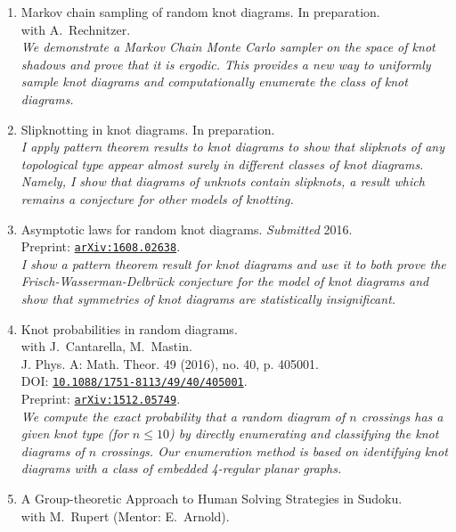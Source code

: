 \documentclass[letterpaper]{article}
\begin{document}
\begin{enumerate}
\item Markov chain sampling of random knot diagrams. In preparation. \\
  with A.\ Rechnitzer. \\
  \textit{We demonstrate a Markov Chain Monte Carlo sampler on the space of knot
    shadows and prove that it is ergodic. This provides a new way to uniformly
    sample knot diagrams and computationally enumerate the class of knot
    diagrams.}
\item Slipknotting in knot diagrams. In preparation. \\
  \textit{I apply pattern theorem results to knot diagrams to show that
    slipknots of any topological type appear almost surely in different classes
    of knot diagrams. Namely, I show that diagrams of unknots contain slipknots,
    a result which remains a conjecture for other models of knotting.}
\item Asymptotic laws for random knot diagrams. \emph{Submitted} 2016. \\
  Preprint: \href{http://arxiv.org/abs/1608.02638}{\tt arXiv:1608.02638}. \\
  \textit{I show a pattern theorem result for knot diagrams and use it to both
    prove the Frisch-Wasserman-Delbr\"uck conjecture for the model of knot
    diagrams and show that symmetries of knot diagrams are statistically
    insignificant.}
\item Knot probabilities in random diagrams.\\
  with J.\ Cantarella, M.\ Mastin. \\
  J. Phys. A: Math. Theor. 49 (2016), no. 40, p. 405001.\\
  DOI: \href{http://dx.doi.org/10.1088/1751-8113/49/40/405001}{\tt 10.1088/1751-8113/49/40/405001}.\\
  Preprint: \href{http://arxiv.org/abs/1512.05749}{\tt arXiv:1512.05749}. \\
  \textit{We compute the exact probability that a random diagram of
    $n$ crossings has a given knot type (for $n \leq 10$) by directly
    enumerating and classifying the knot diagrams of $n$
    crossings. Our enumeration method is based on identifying knot
    diagrams with a class of embedded 4-regular planar graphs.}
\item A Group-theoretic Approach to Human Solving Strategies in
  Sudoku.\\
  with M.\ Rupert (Mentor: E.\ Arnold). \\

\end{enumerate}
\end{document}
